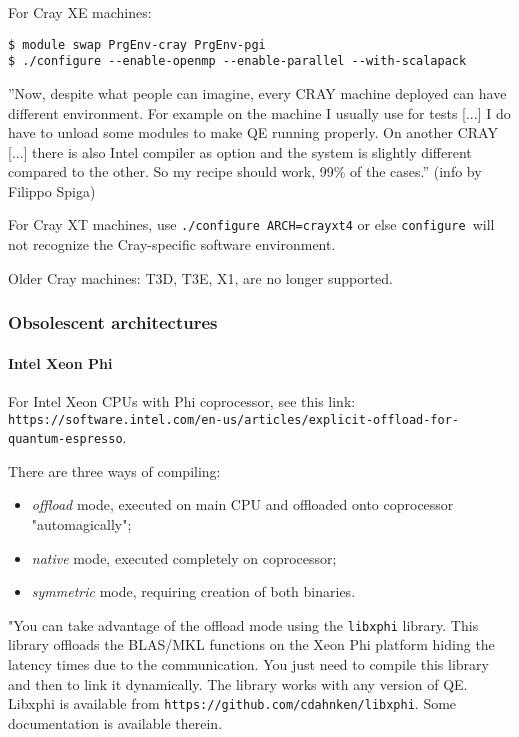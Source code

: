 \documentclass[12pt,a4paper]{article}
\def\configure{\texttt{configure}}
\begin{document}
For Cray XE machines:
\begin{verbatim}
$ module swap PrgEnv-cray PrgEnv-pgi
$ ./configure --enable-openmp --enable-parallel --with-scalapack
\end{verbatim}

''Now, despite what people can imagine, every CRAY machine deployed can
have different environment. For example on the machine I usually use
for tests [...] I do have to unload some modules to make QE running
properly. On another CRAY [...] there is also Intel compiler as option
and the system is slightly different compared to the other.
So my recipe should work, 99\% of the cases.'' (info by Filippo Spiga)

For Cray XT machines, use \texttt{./configure ARCH=crayxt4} or else
\configure\ will not recognize the Cray-specific software environment.

Older Cray machines: T3D, T3E, X1, are no longer supported.

\subsubsection{Obsolescent architectures}

\paragraph{Intel Xeon Phi}

For Intel Xeon CPUs with Phi coprocessor, see this link:\\
\texttt{https://software.intel.com/en-us/articles/explicit-offload-for-quantum-espresso}.

There are three ways of compiling:
\begin{itemize}
\item {\em offload} mode, executed on main CPU and offloaded onto coprocessor
"automagically";
\item {\em native} mode, executed completely on coprocessor;
\item {\em symmetric} mode, requiring creation of both binaries.
\end{itemize}
"You can take advantage of the offload mode using the \texttt{libxphi}
library. This library offloads the BLAS/MKL functions on the Xeon Phi
platform hiding the latency times due to the communication. You just
need to compile this library and then to link it dynamically. The
library works with any version of QE. Libxphi is available from
\texttt{https://github.com/cdahnken/libxphi}. Some documentation is
available therein.
\end{document}
